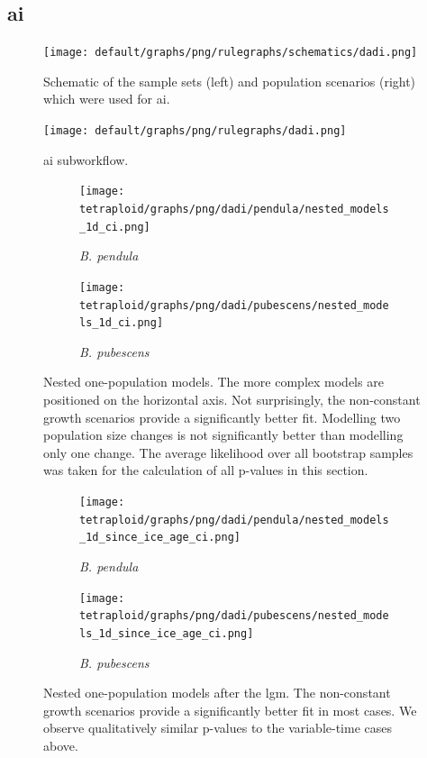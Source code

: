 \documentclass[hidelinks,11pt]{article}
\newcommand{\dadi}{\textdelta a\textdelta i}
\newcommand{\pendula}{\textit{B. pendula}}
\newcommand{\pubescens}{\textit{B. pubescens}}
\begin{document}
    \clearpage

    \subsection{\dadi{}}
    \label{sec:dadi-appendix}
    
    \begin{figure}[ht]
        \centering
        \texttt{[image: default/graphs/png/rulegraphs/schematics/dadi.png]}
        \caption{Schematic of the sample sets (left) and population scenarios (right) which were used for \dadi.}
        \label{fig:schematic_scenarios_dadi}
    \end{figure}

    \begin{figure}[H]
        \centering
        \texttt{[image: default/graphs/png/rulegraphs/dadi.png]}
        \caption{\dadi{} subworkflow.}
        \label{fig:dadi_workflow}
    \end{figure}

    \begin{figure}[H]
        \centering
        \begin{subfigure}[b]{0.49\textwidth}
            \texttt{[image: tetraploid/graphs/png/dadi/pendula/nested\_models\_1d\_ci.png]}
            \caption{\pendula{}}
        \end{subfigure}
        \hfill
        \begin{subfigure}[b]{0.49\textwidth}
            \texttt{[image: tetraploid/graphs/png/dadi/pubescens/nested\_models\_1d\_ci.png]}
            \caption{\pubescens{}}
        \end{subfigure}
        \caption{Nested one-population models. The more complex models are positioned on the horizontal axis. Not surprisingly, the non-constant growth scenarios provide a significantly better fit. Modelling two population size changes is not significantly better than modelling only one change. The average likelihood over all bootstrap samples was taken for the calculation of all p-values in this section.}
        \label{fig:nested_models_1d}
    \end{figure}

    \begin{figure}[H]
        \centering
        \begin{subfigure}[b]{0.49\textwidth}
            \texttt{[image: tetraploid/graphs/png/dadi/pendula/nested\_models\_1d\_since\_ice\_age\_ci.png]}
            \caption{\pendula{}}
        \end{subfigure}
        \hfill
        \begin{subfigure}[b]{0.49\textwidth}
            \texttt{[image: tetraploid/graphs/png/dadi/pubescens/nested\_models\_1d\_since\_ice\_age\_ci.png]}
            \caption{\pubescens{}}
        \end{subfigure}
        \caption{Nested one-population models after the \acrshort{lgm}. The non-constant growth scenarios provide a significantly better fit in most cases. We observe qualitatively similar p-values to the variable-time cases above.}
        \label{fig:nested_models_1d_lgm}
    \end{figure}
\end{document}
